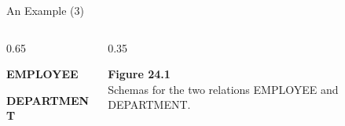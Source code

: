 \begin{frame}{An Example (3)}
    \Large %
    \vspace{-0.5cm} %
    
    \begin{columns}[T] %
        
        \begin{column}{0.65\textwidth}
        
            \textbf{EMPLOYEE} \\
            \vspace{0.1cm}
            
            \vspace{0.8cm} %
            
            \textbf{DEPARTMENT} \\
            \vspace{0.1cm}
            
        \end{column}
        
        \begin{column}{0.35\textwidth}
            \large
            \vspace{2cm} %
            
            \textbf{Figure 24.1} \\
            Schemas for the two relations EMPLOYEE and DEPARTMENT.
        \end{column}
        
    \end{columns}
\end{frame}

